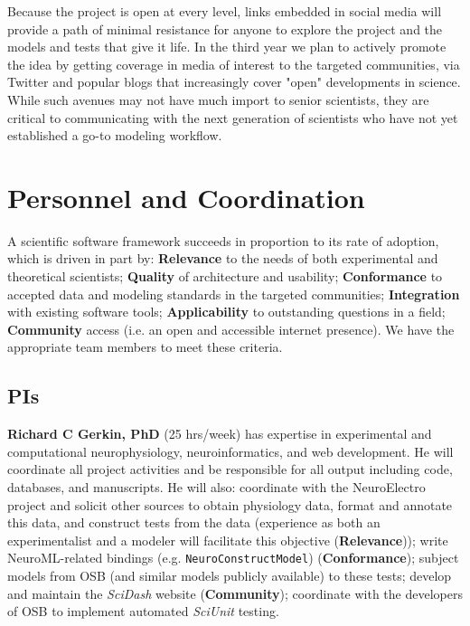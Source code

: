 \documentclass[11pt,letterpaper]{article}
\begin{document}
Because the project is open at every level, links embedded in social media will provide a path of minimal resistance for anyone to explore the project and the models and tests that give it life.  In the third year we plan to actively promote the idea by getting coverage in media of interest to the targeted communities, via Twitter and popular blogs that increasingly cover "open" developments in science.  While such avenues may not have much import to senior scientists, they are critical to communicating with the next generation of scientists who have not yet established a go-to modeling workflow.   

\section{Personnel and Coordination}
\renewcommand{\theenumi}{\alph{enumi}}
A scientific software framework succeeds in proportion to its rate of adoption, which is driven in part by: \textbf{Relevance} to the needs of both experimental and theoretical scientists;
\textbf{Quality} of architecture and usability; \textbf{Conformance} to accepted data and modeling standards in the targeted communities; \textbf{Integration} with existing software tools; \textbf{Applicability} to outstanding questions in a field; \textbf{Community} access (i.e. an open and accessible internet presence). We have the appropriate team members to meet these criteria. 

\subsection{PIs}

\textbf{Richard C Gerkin, PhD} (25 hrs/week) has expertise in experimental and computational neurophysiology, neuroinformatics, and web development.  He will coordinate all project activities and be responsible for all output including code, databases, and manuscripts. He will also: coordinate with the NeuroElectro project and solicit other sources to obtain physiology data, format and annotate this data, and construct tests from the data (experience as both an experimentalist and a modeler will facilitate this objective (\textbf{Relevance})); write NeuroML-related bindings (e.g. \verb|NeuroConstructModel|) (\textbf{Conformance}); subject models from OSB (and similar models publicly available) to these tests; develop and maintain the \textit{SciDash} website (\textbf{Community}); coordinate with the developers of OSB to implement automated \textit{SciUnit} testing.
\end{document}
